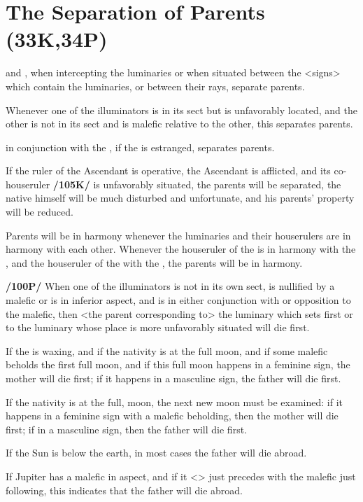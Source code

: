 \section{The Separation of Parents (33K,34P)}

\Mars\xspace and \Saturn, when intercepting the luminaries or when situated between the <signs> which contain the luminaries, or between their rays, separate parents. 

Whenever one of the illuminators is in its sect but is unfavorably located, and the other is not in its sect and is malefic relative to the other, this separates parents. 

\Saturn\xspace in conjunction with the \Sun, if the \Moon\xspace is estranged, separates parents. 

If the ruler of the Ascendant is operative, the Ascendant is afflicted, and its co-houseruler \textbf{/105K/} is unfavorably
situated, the parents will be separated, the native himself will be much disturbed and unfortunate, and his parents’ property will be reduced. 

Parents will be in harmony whenever the luminaries and their
houserulers are in harmony with each other. Whenever the houseruler of the \Sun\xspace is in harmony with the \Moon, and the houseruler of the \Moon\xspace with the \Sun, the parents will be in harmony.

\textbf{/100P/} When one of the illuminators is not in its own sect, is nullified by a malefic or is in inferior aspect, and is in either conjunction with or opposition to the malefic, then <the parent corresponding to> the luminary which sets first or to the luminary whose place is more unfavorably situated will die first. 

If the \Moon\xspace is waxing, and if the nativity is at the full moon, and if some malefic beholds the first full moon,
and if this full moon happens in a feminine sign, the mother will die first; if it happens in a masculine sign, the father will die first. 

If the nativity is at the full, moon, the next new moon must be examined: if it happens in a feminine sign with a malefic beholding, then the mother will die first; if in a masculine sign, then the father will die first.

If the Sun is below the earth, in most cases the father will die abroad. 

If Jupiter has a malefic in aspect, and if it <\Jupiter> just precedes with the malefic just following, this indicates that the father will die abroad. 

